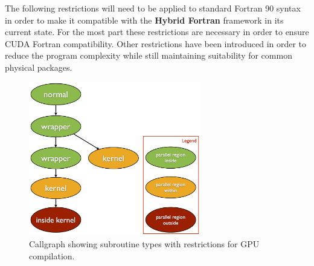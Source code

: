 The following restrictions will need to be applied to standard Fortran 90 syntax in order to make it compatible with the \textbf{Hybrid Fortran} framework in its current state. For the most part these restrictions are necessary in order to ensure CUDA Fortran compatibility. Other restrictions have been introduced in order to reduce the program complexity while still maintaining suitability for common physical packages.

\begin{figure}[htpb]
  \centering
  \includegraphics[width=7.5cm]{figures/subroutineTypes.png}
  \caption[Hybrid Fortran Subroutine Types]{Callgraph showing subroutine types with restrictions for GPU compilation.}
  \label{figure:subroutineTypes}
\end{figure}

